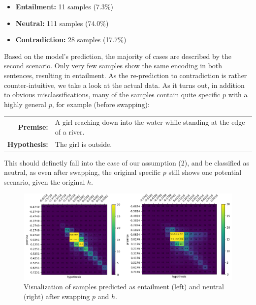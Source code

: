 \begin{itemize}
\item \textbf{Entailment:} 11 samples (7.3\%)
\item \textbf{Neutral:} 111 samples (74.0\%)
\item \textbf{Contradiction:} 28 samples (17.7\%)
\end{itemize}
Based on the model's prediction, the majority of cases are described by the second scenario. Only very few samples show the same encoding in both sentences, resulting in entailment. As the re-prediction to contradiction is rather counter-intuitive, we take a look at the actual data. As it turns out, in addition to obvious misclassifications, many of the samples contain quite specific $p$ with a highly general $p$, for example (before swapping):
\begin{center}
\begin{tabular}{rl}
\textbf{Premise:} & A girl reaching down into the water while standing at the edge of a river. \\
\textbf{Hypothesis:} & The girl is outside.
\end{tabular}
\end{center}
This should definetly fall into the case of our assumption (2), and be classified as neutral, as even after swapping, the original specific $p$ still shows one potential scenario, given the original $h$. 
\begin{figure}[tph!]	\centering
\includegraphics[totalheight=7cm]{fig/alignment_entailment_inversed.png}
	\caption{Visualization of samples predicted as entailment (left) and neutral (right) after swapping $p$ and $h$.}
	\label{fig:alignment_entailment_inversed}
\end{figure}
